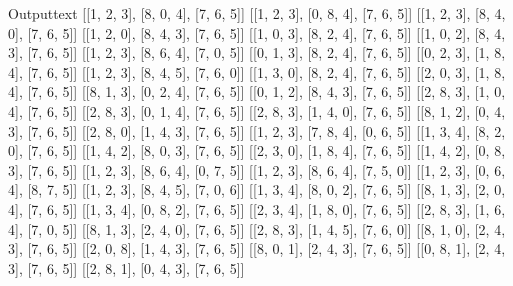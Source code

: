 \documentclass[11pt]{ipu-python}
\begin{document}
    \begin{code}
        {Output}{text}
[[1, 2, 3], [8, 0, 4], [7, 6, 5]]
[[1, 2, 3], [0, 8, 4], [7, 6, 5]]
[[1, 2, 3], [8, 4, 0], [7, 6, 5]]
[[1, 2, 0], [8, 4, 3], [7, 6, 5]]
[[1, 0, 3], [8, 2, 4], [7, 6, 5]]
[[1, 0, 2], [8, 4, 3], [7, 6, 5]]
[[1, 2, 3], [8, 6, 4], [7, 0, 5]]
[[0, 1, 3], [8, 2, 4], [7, 6, 5]]
[[0, 2, 3], [1, 8, 4], [7, 6, 5]]
[[1, 2, 3], [8, 4, 5], [7, 6, 0]]
[[1, 3, 0], [8, 2, 4], [7, 6, 5]]
[[2, 0, 3], [1, 8, 4], [7, 6, 5]]
[[8, 1, 3], [0, 2, 4], [7, 6, 5]]
[[0, 1, 2], [8, 4, 3], [7, 6, 5]]
[[2, 8, 3], [1, 0, 4], [7, 6, 5]]
[[2, 8, 3], [0, 1, 4], [7, 6, 5]]
[[2, 8, 3], [1, 4, 0], [7, 6, 5]]
[[8, 1, 2], [0, 4, 3], [7, 6, 5]]
[[2, 8, 0], [1, 4, 3], [7, 6, 5]]
[[1, 2, 3], [7, 8, 4], [0, 6, 5]]
[[1, 3, 4], [8, 2, 0], [7, 6, 5]]
[[1, 4, 2], [8, 0, 3], [7, 6, 5]]
[[2, 3, 0], [1, 8, 4], [7, 6, 5]]
[[1, 4, 2], [0, 8, 3], [7, 6, 5]]
[[1, 2, 3], [8, 6, 4], [0, 7, 5]]
[[1, 2, 3], [8, 6, 4], [7, 5, 0]]
[[1, 2, 3], [0, 6, 4], [8, 7, 5]]
[[1, 2, 3], [8, 4, 5], [7, 0, 6]]
[[1, 3, 4], [8, 0, 2], [7, 6, 5]]
[[8, 1, 3], [2, 0, 4], [7, 6, 5]]
[[1, 3, 4], [0, 8, 2], [7, 6, 5]]
[[2, 3, 4], [1, 8, 0], [7, 6, 5]]
[[2, 8, 3], [1, 6, 4], [7, 0, 5]]
[[8, 1, 3], [2, 4, 0], [7, 6, 5]]
[[2, 8, 3], [1, 4, 5], [7, 6, 0]]
[[8, 1, 0], [2, 4, 3], [7, 6, 5]]
[[2, 0, 8], [1, 4, 3], [7, 6, 5]]
[[8, 0, 1], [2, 4, 3], [7, 6, 5]]
[[0, 8, 1], [2, 4, 3], [7, 6, 5]]
[[2, 8, 1], [0, 4, 3], [7, 6, 5]]
    \end{code}
\end{document}
